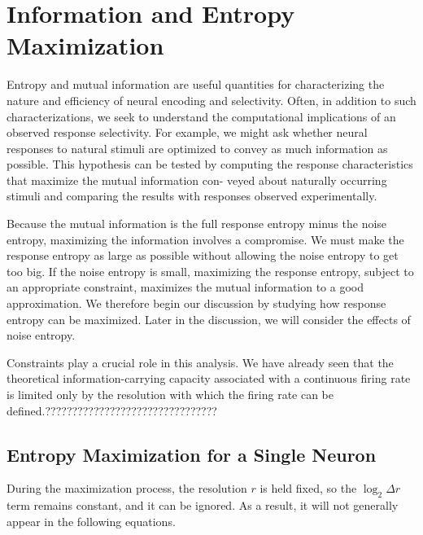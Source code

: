 \section{Information and Entropy Maximization}
\label{sec:Information and Entropy Maximization}
\begin{rem}
  Entropy and mutual information are useful quantities for characterizing
the nature and efficiency of neural encoding and selectivity. Often, in addition to such characterizations, we seek to understand the
computational implications of an observed response selectivity. For example, we might
ask whether neural responses to natural stimuli are optimized to convey as
much information as possible. This hypothesis can be tested by computing
the response characteristics that maximize the mutual information con-
veyed about naturally occurring stimuli and comparing the results with
responses observed experimentally.
\end{rem}

  

\begin{rem}
  Because the mutual information is the full response entropy minus the
noise entropy, maximizing the information involves a compromise. We
must make the response entropy as large as possible without allowing the
noise entropy to get too big. If the noise entropy is small, maximizing
the response entropy, subject to an appropriate constraint, maximizes the
mutual information to a good approximation. We therefore begin our discussion by studying how response entropy can be maximized. Later in the
discussion, we will consider the effects of noise entropy.
\end{rem}
\begin{rem}
  Constraints play a crucial role in this analysis. We have already seen that
the theoretical information-carrying capacity associated with a continuous
firing rate is limited only by the resolution with which the firing rate can be
defined.????????????????????????????????
\end{rem}
\subsection{Entropy Maximization for a Single Neuron}
\begin{asm}
 During the maximization process, the resolution $r$ is held fixed, so the
 $\log_2\Delta r$ term remains constant, and it can be ignored. As a
 result, it will not generally appear in the following equations.
\end{asm}

